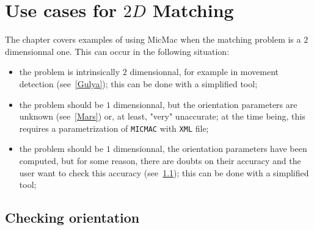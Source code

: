 \chapter{Use cases for $2D$ Matching}

The chapter covers examples of using MicMac when the matching problem is
a $2$ dimensionnal one. This can occur in the following situation:


\begin{itemize}
   \item the problem is intrinsically $2$ dimensionnal, for example in
         movement detection (see~\ref{Gulya}); this can be done with a simplified tool;

   \item the problem should be $1$ dimensionnal, but the orientation parameters
         are unknown (see~\ref{Mars}) or, at least, "very" unaccurate; at the time being,
         this requires a parametrization of {\tt MICMAC} with {\tt XML} file;

   \item the problem should be $1$ dimensionnal, the orientation parameters have been computed,
         but for some reason, there are doubts on their accuracy and the user want to check
         this accuracy (see~\ref{CheckOri});  this can be done with a simplified tool;
\end{itemize}



\section{Checking orientation}
\label{CheckOri}

